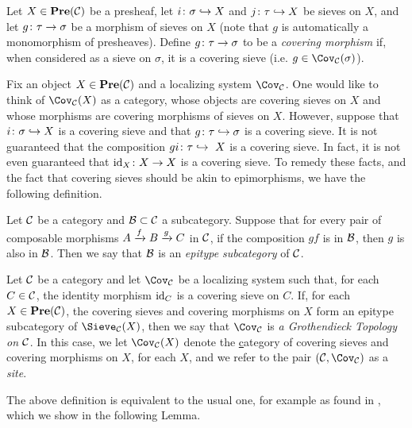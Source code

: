 \documentclass[10pt]{amsart}
\begin{document}
\begin{definition}
Let $X\in{\bf Pre}(\mathcal{C})$ be a presheaf, let $i\colon\sigma\hookrightarrow X$ and $j\colon\tau\hookrightarrow X$ be sieves on $X$, and let $g\colon\tau\rightarrow\sigma$ be a morphism of sieves on $X$ (note that $g$ is automatically a monomorphism of presheaves).  Define $g\colon\tau\rightarrow\sigma$ to be a {\em covering morphism} if, when considered as a sieve on $\sigma$, it is a covering sieve (i.e. $g\in\Cov_\mcC(\sigma)$).

\end{definition}

Fix an object $X\in{\bf Pre}(\mathcal{C})$ and a localizing system $\Cov_\mcC$.  One would like to think of $\Cov_\mcC(X)$ as a category, whose objects are covering sieves on $X$ and whose morphisms are covering morphisms of sieves on $X$.  However, suppose that $i\colon\sigma\hookrightarrow X$ is a covering sieve and that $g\colon\tau\hookrightarrow\sigma$ is a covering sieve.  It is not guaranteed that the composition $gi\colon\tau\hookrightarrow\ X$ is a covering sieve.  In fact, it is not even guaranteed that $\textnormal{id}_X\colon X\rightarrow X$ is a covering sieve.  To remedy these facts, and the fact that covering sieves should be akin to epimorphisms, we have the following definition.

\begin{definition}\label{epitype}

Let $\mathcal{C}$ be a category and $\mathcal{B}\subset\mathcal{C}$ a subcategory.  Suppose that for every pair of composable morphisms $A\xrightarrow{f}B\xrightarrow{g}C$ in $\mathcal{C}$,  if the composition $gf$ is in $\mathcal{B}$, then $g$ is also in $\mathcal{B}$.  Then we say that $\mathcal{B}$ is an {\em epitype subcategory} of $\mathcal{C}$. 

\end{definition}

\begin{definition}  \label{gro top}

Let $\mathcal{C}$ be a category and let $\Cov_\mcC$ be a localizing system such that, for each $C\in\mathcal{C}$, the identity morphism $\textnormal{id}_C$ is a covering sieve on $C$.  If, for each $X\in{\bf Pre}(\mathcal{C})$, the covering sieves and covering
morphisms on $X$ form an epitype subcategory of $\Sieve_\mcC(X)$, then we say that $\Cov_\mcC$ is {\em a Grothendieck Topology on
$\mathcal{C}$}.  In this case, we let $\Cov_\mcC(X)$ denote the {\underline category} of covering sieves and covering morphisms on $X$, for each $X$, and we refer to the pair $(\mcC,\Cov_\mcC)$ as a {\em site}.

\end{definition}

The above definition is equivalent to the usual one, for example as found in \cite[3.2.4]{Bor3}, which we show in the following
Lemma.
\end{document}
